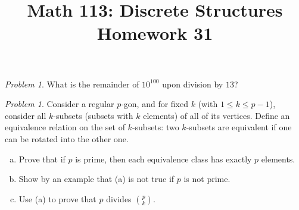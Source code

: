 \documentclass[11pt,twoside]{amsart}
\title{Math 113: Discrete Structures\\ Homework 31}
\theoremstyle{plain}
\theoremstyle{remark}
\newtheorem{prob}[prop]{Problem}
\theoremstyle{definition}
\theoremstyle{definition}
\begin{document}
\maketitle



\begin{prob}
What is the remainder of $10^{100}$ upon division by $13$?
\end{prob}



\begin{prob}
Consider a regular $p$-gon, and for fixed $k$ (with $1\leq k \leq p-1$), consider all $k$-subsets (subsets with $k$ elements) of all of its vertices. Define an equivalence relation on the set of $k$-subsets: two $k$-subsets are equivalent if one can be rotated into the other one.

\begin{enumerate}[(a)]
 \item Prove that if $p$ is prime, then each equivalence class has exactly $p$ elements.
 \item Show by an example that (a) is not true if $p$ is not prime.
 \item Use (a) to prove that $p$ divides $\binom{p}{k}$.
\end{enumerate}
\end{prob}
\end{document}
